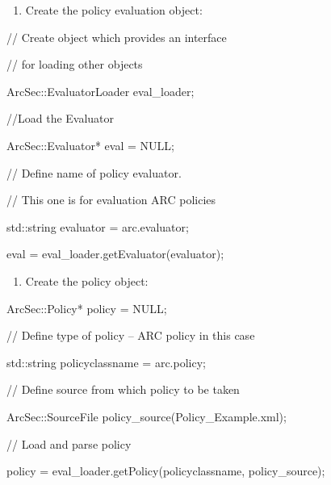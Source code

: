 \documentclass{article}
\newcommand\liststyleWWviiiNumiii{%
\renewcommand\theenumi{\alph{enumi}}
\renewcommand\theenumii{\arabic{enumii}}
\renewcommand\theenumiii{\arabic{enumiii}}
\renewcommand\theenumiv{\arabic{enumiv}}
\renewcommand\labelenumi{\theenumi)}
\renewcommand\labelenumii{\theenumii.}
\renewcommand\labelenumiii{\theenumiii.}
\renewcommand\labelenumiv{\theenumiv.}
}
\newcommand\liststyleWWviiiNumiv{%
\renewcommand\theenumi{\alph{enumi}}
\renewcommand\theenumii{\arabic{enumii}}
\renewcommand\theenumiii{\arabic{enumiii}}
\renewcommand\theenumiv{\arabic{enumiv}}
\renewcommand\labelenumi{\theenumi)}
\renewcommand\labelenumii{\theenumii.}
\renewcommand\labelenumiii{\theenumiii.}
\renewcommand\labelenumiv{\theenumiv.}
}
\begin{document}
\liststyleWWviiiNumiii
\begin{enumerate}
\item {\color{black}
Create the policy evaluation object:}
\end{enumerate}
{\ttfamily\color{black}
// Create object which provides an interface }

{\ttfamily\color{black}
// for loading other objects}

{\ttfamily\color{black}
ArcSec::EvaluatorLoader eval\_loader; }

{\ttfamily\color{black}
//Load the Evaluator }

{\ttfamily\color{black}
ArcSec::Evaluator* eval = NULL;}

{\ttfamily\color{black}
// Define name of policy evaluator.}

{\ttfamily\color{black}
// This one is for evaluation ARC policies}

{\ttfamily\color{black}
std::string evaluator = {\textquotedbl}arc.evaluator{\textquotedbl}; }

{\ttfamily\color{black}
eval = eval\_loader.getEvaluator(evaluator);}

\liststyleWWviiiNumiv
\begin{enumerate}
\item {\color{black}
Create the policy object:}
\end{enumerate}
{\ttfamily\color{black}
ArcSec::Policy* policy = NULL; }

{\ttfamily\color{black}
// Define type of policy -- ARC policy in this case}

{\ttfamily\color{black}
std::string policyclassname = {\textquotedbl}arc.policy{\textquotedbl};
}

{\ttfamily\color{black}
// Define source from which policy to be taken}

{\ttfamily\color{black}
ArcSec::SourceFile
policy\_source({\textquotedbl}Policy\_Example.xml{\textquotedbl}); }

{\ttfamily\color{black}
// Load and parse policy}

{\ttfamily\color{black}
policy = eval\_loader.getPolicy(policyclassname, policy\_source); }
\end{document}
